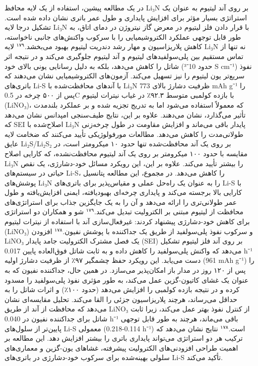 \documentclass[12pt,a4paper,twocolumn]{article} %
\newcommand{\persian}[1]{\textfarsi{#1}}
\newcommand{\english}[1]{\textenglish{#1}}
\begin{document}
\persian{
در یک مطالعه پیشین، استفاده از یک لایه محافظ \english{Li₃N} بر روی آند لیتیوم به عنوان یک استراتژی بسیار مؤثر برای افزایش پایداری و طول عمر باتری نشان داده شده است. تشکیل درجا لایه \english{Li₃N} با قرار دادن فلز لیتیوم در معرض گاز نیتروژن در دمای اتاق، به طور قابل توجهی عملکرد الکتروشیمیایی را با سرکوب واکنش‌های جانبی ناخواسته، کاهش پلاریزاسیون و مهار رشد دندریت لیتیوم بهبود می‌بخشد.$^{۱۷۹}$ لایه \english{Li₃N} نه تنها از تماس مستقیم بین پلی‌سولفیدهای لیتیوم و آند لیتیوم جلوگیری می‌کند و در نتیجه اثر شاتل را کاهش می‌دهد، بلکه به دلیل رسانایی یونی بالای خود (حدود \english{10⁻³ S cm⁻¹}) نفوذ سریع‌تر یون لیتیوم را نیز تسهیل می‌کند. آزمون‌های الکتروشیمیایی نشان می‌دهند که باتری‌های \english{Li-S} با آندهای محافظت‌شده با \english{Li₃N} ظرفیت دشارژ بالای \english{773 mAh g⁻¹} را پس از ۵۰۰ چرخه در \english{0.5C} با بازده کولمبی متوسط ۹۲.۳٪ در غیاب نیترات لیتیوم (\english{LiNO₃})، که معمولاً استفاده می‌شود اما به تدریج تجزیه شده و بر عملکرد بلندمدت تأثیر می‌گذارد، نشان می‌دهند. علاوه بر این، نتایج طیف‌سنجی امپدانس نشان می‌دهد که \english{SEI} اصلاح‌شده با \english{Li₃N} پایدار باقی می‌ماند و افزایش مقاومت در طول چرخه‌زنی طولانی‌مدت را کاهش می‌دهد. مطالعات مورفولوژیکی تأیید می‌کنند که ضخامت لایه عایق \english{Li₂S/Li₂S₂} بر روی یک آند محافظت‌شده تنها حدود ۱۰ میکرومتر است، در مقایسه با حدود ۱۰۰ میکرومتر بر روی یک آند لیتیوم محافظت‌نشده، که کارایی اصلاح \english{Li₃N} را بیشتر تأیید می‌کند. علاوه بر این، این رویکرد مسائل خود-دشارژی، یک نقص حیاتی در سیستم‌های \english{Li-S}، را کاهش می‌دهد. در مجموع، این مطالعه پتانسیل پوشش‌های \english{Li₃N} را به عنوان یک راه‌حل عملی و مقیاس‌پذیر برای باتری‌های \english{Li-S} با کارایی بالا برجسته می‌کند و پایداری چرخه‌ای بهبودیافته، ایمنی افزایش‌یافته و طول عمر طولانی‌تری را ارائه می‌دهد و آن را به یک جایگزین جذاب برای استراتژی‌های محافظت از لیتیوم مبتنی بر الکترولیت تبدیل می‌کند.$^{۱۷۹}$
}
\persian{
شو و همکاران دو استراتژی برای کاهش خود-دشارژی پیشنهاد کردند: غیرفعال‌سازی آند با استفاده از نیترات لیتیوم (\english{LiNO₃}) و سرکوب نفوذ پلی‌سولفید از طریق یک جداکننده با پوشش نفیون.$^{۱۷۸}$ افزودن \english{LiNO₃} یک فصل مشترک الکترولیت جامد پایدار (\english{SEI}) بر روی آند فلز لیتیوم تشکیل می‌دهد که واکنش پلی‌سولفید را کاهش داده و به ثابت شاتل فوق‌العاده پایین \english{0.017 h⁻¹} دست می‌یابد. این رویکرد حفظ چشمگیر ۹۷٪ از ظرفیت دشارژ اولیه (\english{961 mAh g⁻¹}) را پس از ۱۲۰ روز در مدار باز امکان‌پذیر می‌سازد. در همین حال، جداکننده نفیون که به عنوان یک غشای کاتیون-گزین عمل می‌کند، به طور مؤثری نفوذ پلی‌سولفید را مسدود کرده و در نتیجه بازده کولمبی را افزایش می‌دهد (حدود ۱۰۰٪) و اثرات شاتل را به حداقل می‌رساند، هرچند پلاریزاسیون جزئی را القا می‌کند. تحلیل مقایسه‌ای نشان می‌دهد که محافظت از آند از طریق \english{LiNO₃} از کنترل نفوذ بهتر عمل می‌کند، زیرا ثابت شاتل برای جداکننده نفیون در \english{0.040 h⁻¹} باقی می‌ماند، هرچند به طور قابل توجهی پایین‌تر از سلول‌های \english{Li-S} معمولی (\english{0.114-0.218 h⁻¹}) است.$^{۱۷۸}$ نتایج نشان می‌دهد که ترکیب هر دو استراتژی می‌تواند پایداری باتری را بیشتر افزایش دهد. این مطالعه بر اهمیت طراحی افزودنی‌های الکترولیت پیشرفته، غشاهای یون-گزین و معماری‌های سلولی بهینه‌شده برای سرکوب خود-دشارژی در باتری‌های \english{Li-S} تأکید می‌کند.
}
\end{document}
